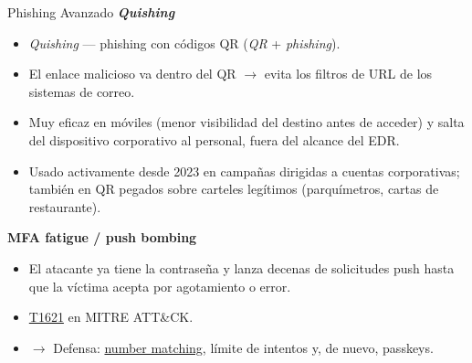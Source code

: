 \documentclass[aspectratio=169,11pt]{beamer}
\newcommand{\term}[1]{\emph{#1}}
\newcommand{\lead}[1]{{\color{uznavy}\bfseries #1}\par\smallskip}
\begin{document}
\begin{frame}{Phishing Avanzado}
\small
\lead{\term{Quishing}}
  \begin{itemize}
  \item \term{Quishing} --- phishing con códigos QR (\emph{QR} + \emph{phishing}).
  \item El enlace malicioso va dentro del QR $\rightarrow$ evita los filtros de URL de los sistemas de correo.
  \item Muy eficaz en móviles (menor visibilidad del destino antes de acceder) y salta del dispositivo corporativo al personal, fuera del alcance del EDR.
  \item Usado activamente desde 2023 en campañas dirigidas a cuentas corporativas; también en QR pegados sobre carteles legítimos (parquímetros, cartas de restaurante).
  \end{itemize}

\lead{MFA fatigue / push bombing}
  \begin{itemize}
  \item El atacante ya tiene la contraseña y lanza decenas de solicitudes push hasta que la víctima acepta por agotamiento o error.
  \item \href{https://attack.mitre.org/techniques/T1621/}{T1621} en MITRE ATT\&CK.
  \item $\rightarrow$ Defensa: \href{https://learn.microsoft.com/en-us/entra/identity/authentication/how-to-mfa-number-match}{number matching}, límite de intentos y, de nuevo, passkeys.
  \end{itemize}
\end{frame}
\end{document}
